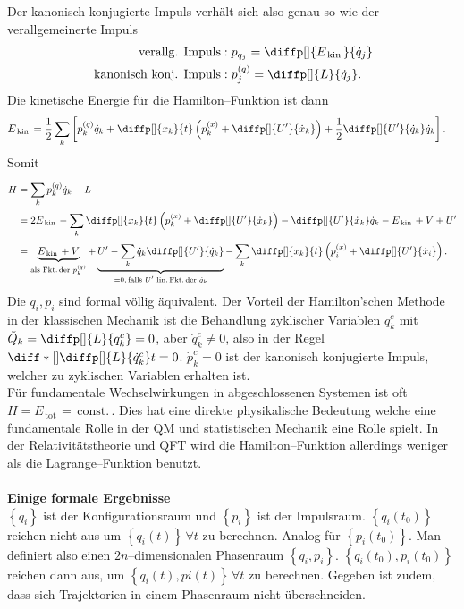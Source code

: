 \documentclass[a4paper,12pt]{article}
\numberwithin{equation}{section}
\begin{document}
Der kanonisch konjugierte Impuls verhält sich also genau so wie der verallgemeinerte Impuls
\begin{align*}
        \,\text{verallg. Impuls}&:p_{q_j}=\diffp[]{E_{\,\text{kin}\,}}{\dot{q}_j}\\
        \,\text{kanonisch konj. Impuls}&:p_j^{(q)}=\diffp[]{L}{\dot{q}_j}
.\end{align*}
Die kinetische Energie für die Hamilton--Funktion ist dann
\begin{align*}
        E_{\,\text{kin}\,}&=\dfrac{1}{2}\sum_{k}^{}\left[p_k^{(q)}\dot{q}_k+\diffp[]{x_k}{t}\left(p_k^{(x)}+\diffp[]{U'}{\dot{x}_k}\right)+\dfrac{1}{2}\diffp[]{U'}{\dot{q}_k}\dot{q}_k\right]
.\end{align*}
Somit
\begin{align*}
        H&=\sum_{k}^{}p_k^{(q)}\dot{q}_k-L\\
         &=2E_{\,\text{kin}\,}-\sum_{k}^{}\diffp[]{x_k}{t}\left(p_k^{(x)}+\diffp[]{U'}{\dot{x}_k}\right)-\diffp[]{U'}{\dot{x}_k}\dot{q}_k-E_{\,\text{kin}\,}+V+U'\\
         &=\underbrace{E_{\,\text{kin}\,}+V}_{\text{als Fkt.\,der $p_k^{(q)}$}}+\underbrace{U'-\sum_{k}^{}\dot{q}_k\diffp[]{U'}{\dot{q}_k}}_{=0,\,\text{falls $U'$ lin.\,Fkt.\,der $\dot{q}_k$}}-\sum_{k}^{}\diffp[]{x_k}{t}\left(p_i^{(x)}+\diffp[]{U'}{\dot{x}_i}\right)
.\end{align*}
Die $q_i,p_i$ sind formal völlig äquivalent. Der Vorteil der Hamilton'schen Methode in der klassischen Mechanik ist die Behandlung zyklischer Variablen $q_k^c$ mit $\tilde Q_k=\diffp[]{L}{q_k^c}=0$, aber $\dot{q}_k^c\neq 0$, also in der Regel $\diff*[]{\diffp[]{L}{\dot{q}_k^c}}{t}=0$. $\dot{p}_k^c=0$ ist der kanonisch konjugierte Impuls, welcher zu zyklischen Variablen erhalten ist.\\\indent
Für fundamentale Wechselwirkungen in abgeschlossenen Systemen ist oft $H=E_{\,\text{tot}\,}=\,\text{const.}\,$. Dies hat eine direkte physikalische Bedeutung welche eine fundamentale Rolle in der QM und statistischen Mechanik eine Rolle spielt. In der Relativitätstheorie und QFT wird die Hamilton--Funktion allerdings weniger als die Lagrange--Funktion benutzt.
\\\hfill\\\textbf{Einige formale Ergebnisse}\\ 
$\left\{q_i\right\}$ ist der Konfigurationsraum und $\left\{p_i\right\}$ ist der Impulsraum. $\left\{q_i(t_0)\right\}$ reichen nicht aus um $\left\{q_i(t)\right\}\,\forall t$ zu berechnen. Analog für $\left\{p_i(t_0)\right\}$. Man definiert also einen $2n$--dimensionalen Phasenraum $\left\{q_i,p_i\right\}$. $\left\{q_i(t_0),p_i(t_0)\right\}$ reichen dann aus, um $\left\{q_i(t),pi(t)\right\}\,\forall t$ zu berechnen. Gegeben ist zudem, dass sich Trajektorien in einem Phasenraum nicht überschneiden.
\end{document}
